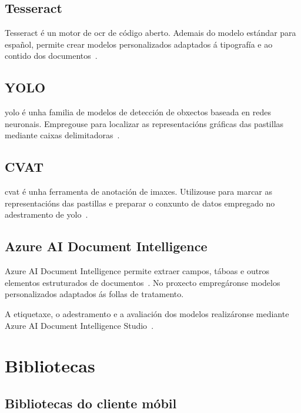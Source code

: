 \subsection{Tesseract}
\label{sec:tec-tesseract}

Tesseract é un motor de \gls{ocr} de código aberto. Ademais do modelo estándar para español, permite crear modelos personalizados adaptados á tipografía e ao contido dos documentos~\cite{TesseractOCR}.

\subsection{YOLO}
\label{sec:tec-yolo}

\gls{yolo} é unha familia de modelos de detección de obxectos baseada en redes neuronais. Empregouse para localizar as representacións gráficas das pastillas mediante caixas delimitadoras~\cite{UltralyticsYOLO}.

\subsection{CVAT}
\label{sec:tec-cvat}

\gls{cvat} é unha ferramenta de anotación de imaxes. Utilizouse para marcar as representacións das pastillas e preparar o conxunto de datos empregado no adestramento de \gls{yolo}~\cite{CVATDocumentation}.

\subsection{Azure AI Document Intelligence}
\label{sec:tec-azure-di}
\label{sec:azure-document-intelligence}

Azure AI Document Intelligence permite extraer campos, táboas e outros elementos estruturados de documentos~\cite{AzureDocumentIntelligence}. No proxecto empregáronse modelos personalizados adaptados ás follas de tratamento.

A etiquetaxe, o adestramento e a avaliación dos modelos realizáronse mediante Azure AI Document Intelligence Studio~\cite{AzureDocumentIntelligenceStudio}.

\section{Bibliotecas}

\subsection{Bibliotecas do cliente móbil}

